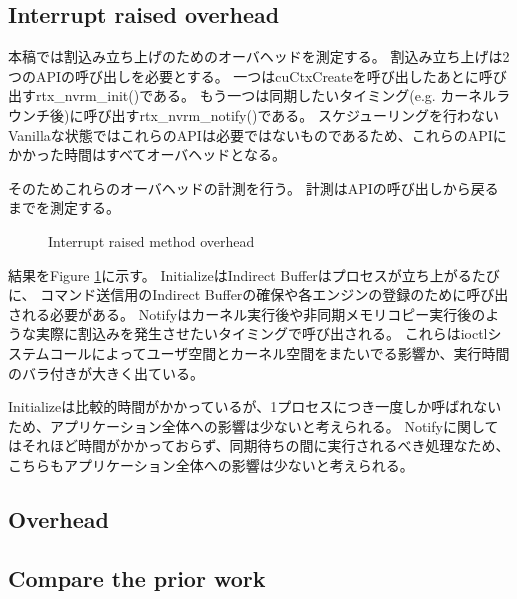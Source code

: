 \subsection{Interrupt raised overhead}
本稿では割込み立ち上げのためのオーバヘッドを測定する。
割込み立ち上げは2つのAPIの呼び出しを必要とする。
一つはcuCtxCreateを呼び出したあとに呼び出すrtx\_nvrm\_init()である。
もう一つは同期したいタイミング(e.g. カーネルラウンチ後)に呼び出すrtx\_nvrm\_notify()である。
スケジューリングを行わないVanillaな状態ではこれらのAPIは必要ではないものであるため、これらのAPIにかかった時間はすべてオーバヘッドとなる。

そのためこれらのオーバヘッドの計測を行う。
計測はAPIの呼び出しから戻るまでを測定する。

\begin{figure}[!t]
\begin{center}
\caption{Interrupt raised method overhead}
\label{fig:irq_rise_overhead}
\end{center}
\end{figure}

結果をFigure \ref{fig:irq_rise_overhead}に示す。
InitializeはIndirect Bufferはプロセスが立ち上がるたびに、
コマンド送信用のIndirect Bufferの確保や各エンジンの登録のために呼び出される必要がある。
Notifyはカーネル実行後や非同期メモリコピー実行後のような実際に割込みを発生させたいタイミングで呼び出される。
これらはioctlシステムコールによってユーザ空間とカーネル空間をまたいでる影響か、実行時間のバラ付きが大きく出ている。

Initializeは比較的時間がかかっているが、1プロセスにつき一度しか呼ばれないため、アプリケーション全体への影響は少ないと考えられる。
Notifyに関してはそれほど時間がかかっておらず、同期待ちの間に実行されるべき処理なため、こちらもアプリケーション全体への影響は少ないと考えられる。

\subsection{Overhead}


\subsection{Compare the prior work}
